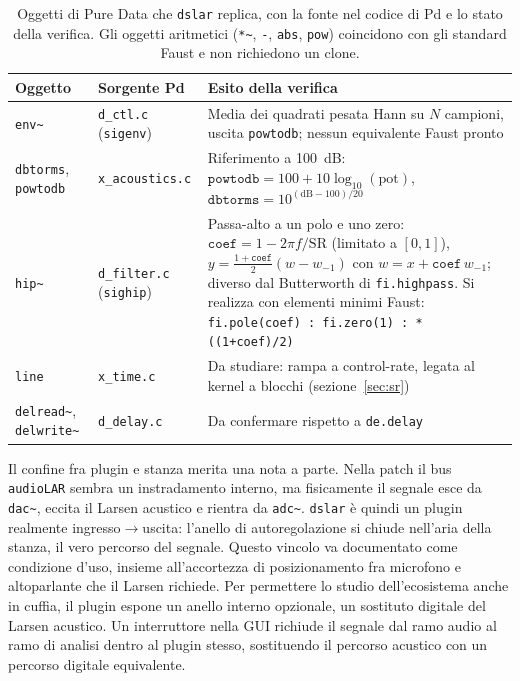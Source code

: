 \documentclass[11pt,a4paper]{article}
\begin{document}
\begin{table}[htbp]
\centering
\small
\begin{tabular}{@{}>{\raggedright\arraybackslash}p{2.5cm}>{\raggedright\arraybackslash}p{2.7cm}>{\raggedright\arraybackslash}p{8.9cm}@{}}
\toprule
Oggetto & Sorgente Pd & Esito della verifica \\
\midrule
\texttt{env\textasciitilde{}} & \texttt{d\_ctl.c} (\texttt{sigenv}) & Media dei quadrati pesata Hann su $N$ campioni, uscita \texttt{powtodb}; nessun equivalente Faust pronto \\[3pt]
\texttt{dbtorms}, \texttt{powtodb} & \texttt{x\_acoustics.c} & Riferimento a \SI{100}{\deci\bel}: $\texttt{powtodb}=100+10\log_{10}(\text{pot})$, $\texttt{dbtorms}=10^{(\text{dB}-100)/20}$ \\[3pt]
\texttt{hip\textasciitilde{}} & \texttt{d\_filter.c} (\texttt{sighip}) & Passa-alto a un polo e uno zero: $\texttt{coef}=1-2\pi f/\text{SR}$ (limitato a $[0,1]$), $y=\tfrac{1+\texttt{coef}}{2}(w-w_{-1})$ con $w=x+\texttt{coef}\,w_{-1}$; diverso dal Butterworth di \texttt{fi.highpass}. Si realizza con elementi minimi Faust: \texttt{fi.pole(coef) : fi.zero(1) : *((1+coef)/2)} \\[3pt]
\texttt{line} & \texttt{x\_time.c} & Da studiare: rampa a control-rate, legata al kernel a blocchi (sezione~\ref{sec:sr}) \\[3pt]
\texttt{delread\textasciitilde{}}, \texttt{delwrite\textasciitilde{}} & \texttt{d\_delay.c} & Da confermare rispetto a \texttt{de.delay} \\
\bottomrule
\end{tabular}
\caption{Oggetti di Pure Data che \texttt{dslar} replica, con la fonte nel codice di Pd e lo stato della verifica. Gli oggetti aritmetici (\texttt{*\textasciitilde{}}, \texttt{-}, \texttt{abs}, \texttt{pow}) coincidono con gli standard Faust e non richiedono un clone.}
\label{tab:pdclone}
\end{table}

Il confine fra plugin e stanza merita una nota a parte.
Nella patch il bus \texttt{audioLAR} sembra un instradamento interno, ma fisicamente il segnale esce da \texttt{dac\textasciitilde{}}, eccita il Larsen acustico e rientra da \texttt{adc\textasciitilde{}}.
\texttt{dslar} è quindi un plugin realmente ingresso$\to$uscita: l'anello di autoregolazione si chiude nell'aria della stanza, il vero percorso del segnale.
Questo vincolo va documentato come condizione d'uso, insieme all'accortezza di posizionamento fra microfono e altoparlante che il Larsen richiede.
Per permettere lo studio dell'ecosistema anche in cuffia, il plugin espone un anello interno opzionale, un sostituto digitale del Larsen acustico.
Un interruttore nella GUI richiude il segnale dal ramo audio al ramo di analisi dentro al plugin stesso, sostituendo il percorso acustico con un percorso digitale equivalente.
\end{document}
